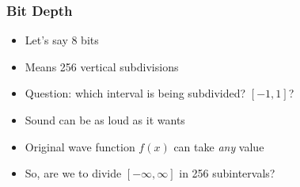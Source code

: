 

\begin{frame}
  \frametitle{Bit Depth}
  \begin{itemize}
    \item Let's say 8 bits
    \item Means 256 vertical subdivisions
    \item Question: which interval is being subdivided? $[-1,1]$?
    \item Sound can be as loud as it wants
    \item Original wave function $f(x)$ can take \emph{any} value
    \item So, are we to divide $[-\infty,\infty]$ in 256 subintervals?
  \end{itemize}
\end{frame}

